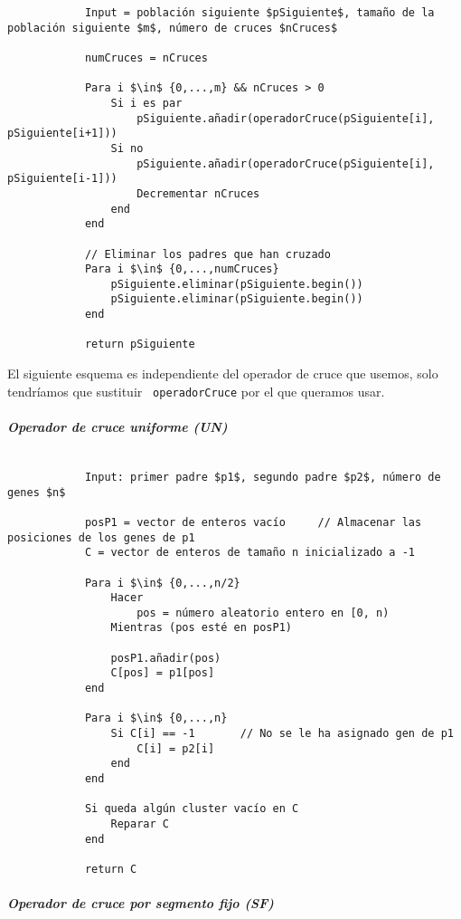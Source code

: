 		\footnotesize 
		\begin{lstlisting}
			Input = población siguiente $pSiguiente$, tamaño de la población siguiente $m$, número de cruces $nCruces$
			
			numCruces = nCruces

			Para i $\in$ {0,...,m} && nCruces > 0
				Si i es par
					pSiguiente.añadir(operadorCruce(pSiguiente[i], pSiguiente[i+1]))
				Si no
					pSiguiente.añadir(operadorCruce(pSiguiente[i], pSiguiente[i-1]))
					Decrementar nCruces
				end 
			end 

			// Eliminar los padres que han cruzado
			Para i $\in$ {0,...,numCruces}
				pSiguiente.eliminar(pSiguiente.begin())
				pSiguiente.eliminar(pSiguiente.begin())
			end

			return pSiguiente
		\end{lstlisting}
		\normalsize

		El siguiente esquema es independiente del operador de cruce que usemos, solo tendríamos que sustituir \lstinline! operadorCruce! por el que queramos usar.
		
		\subparagraph{Operador de cruce uniforme (UN)}
		$ $\\

		\footnotesize 
		\begin{lstlisting}
			Input: primer padre $p1$, segundo padre $p2$, número de genes $n$

			posP1 = vector de enteros vacío 	// Almacenar las posiciones de los genes de p1 
			C = vector de enteros de tamaño n inicializado a -1

			Para i $\in$ {0,...,n/2}
				Hacer 
					pos = número aleatorio entero en [0, n)
				Mientras (pos esté en posP1)

				posP1.añadir(pos)
				C[pos] = p1[pos]
			end 

			Para i $\in$ {0,...,n}
				Si C[i] == -1 		// No se le ha asignado gen de p1
					C[i] = p2[i]
				end 
			end 

			Si queda algún cluster vacío en C
				Reparar C
			end

			return C		
		\end{lstlisting}
		\normalsize

		\subparagraph{Operador de cruce por segmento fijo (SF)}
		$ $\\

